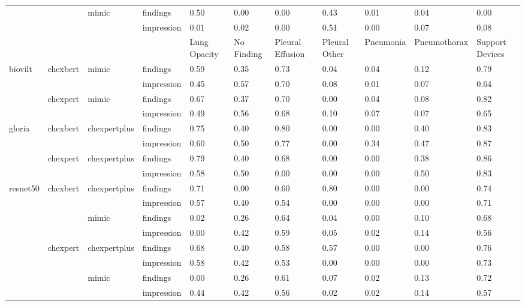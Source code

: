 \begin{tabular}{lllllllllll}
\cmidrule(lr){3-11}
 &  & \multirow[t]{2}{*}{mimic} & findings & 0.50 & 0.00 & 0.00 & 0.43 & 0.01 & 0.04 & 0.00 \\
 &  &  & impression & 0.01 & 0.02 & 0.00 & 0.51 & 0.00 & 0.07 & 0.08 \\
\cmidrule(lr){1-11} \cmidrule(lr){2-11} \cmidrule(lr){3-11}
 &  &  &  & Lung Opacity & No Finding & Pleural Effusion & Pleural Other & Pneumonia & Pneumothorax & Support Devices \\
\cmidrule(lr){1-11} \cmidrule(lr){2-11} \cmidrule(lr){3-11}
\multirow[t]{4}{*}{biovilt} & \multirow[t]{2}{*}{chexbert} & \multirow[t]{2}{*}{mimic} & findings & 0.59 & 0.35 & 0.73 & 0.04 & 0.04 & 0.12 & 0.79 \\
 &  &  & impression & 0.45 & 0.57 & 0.70 & 0.08 & 0.01 & 0.07 & 0.64 \\
\cmidrule(lr){2-11} \cmidrule(lr){3-11}
 & \multirow[t]{2}{*}{chexpert} & \multirow[t]{2}{*}{mimic} & findings & 0.67 & 0.37 & 0.70 & 0.00 & 0.04 & 0.08 & 0.82 \\
 &  &  & impression & 0.49 & 0.56 & 0.68 & 0.10 & 0.07 & 0.07 & 0.65 \\
\cmidrule(lr){1-11} \cmidrule(lr){2-11} \cmidrule(lr){3-11}
\multirow[t]{4}{*}{gloria} & \multirow[t]{2}{*}{chexbert} & \multirow[t]{2}{*}{chexpertplus} & findings & 0.75 & 0.40 & 0.80 & 0.00 & 0.00 & 0.40 & 0.83 \\
 &  &  & impression & 0.60 & 0.50 & 0.77 & 0.00 & 0.34 & 0.47 & 0.87 \\
\cmidrule(lr){2-11} \cmidrule(lr){3-11}
 & \multirow[t]{2}{*}{chexpert} & \multirow[t]{2}{*}{chexpertplus} & findings & 0.79 & 0.40 & 0.68 & 0.00 & 0.00 & 0.38 & 0.86 \\
 &  &  & impression & 0.58 & 0.50 & 0.00 & 0.00 & 0.00 & 0.50 & 0.83 \\
\cmidrule(lr){1-11} \cmidrule(lr){2-11} \cmidrule(lr){3-11}
\multirow[t]{8}{*}{resnet50} & \multirow[t]{4}{*}{chexbert} & \multirow[t]{2}{*}{chexpertplus} & findings & 0.71 & 0.00 & 0.60 & 0.80 & 0.00 & 0.00 & 0.74 \\
 &  &  & impression & 0.57 & 0.40 & 0.54 & 0.00 & 0.00 & 0.00 & 0.71 \\
\cmidrule(lr){3-11}
 &  & \multirow[t]{2}{*}{mimic} & findings & 0.02 & 0.26 & 0.64 & 0.04 & 0.00 & 0.10 & 0.68 \\
 &  &  & impression & 0.00 & 0.42 & 0.59 & 0.05 & 0.02 & 0.14 & 0.56 \\
\cmidrule(lr){2-11} \cmidrule(lr){3-11}
 & \multirow[t]{4}{*}{chexpert} & \multirow[t]{2}{*}{chexpertplus} & findings & 0.68 & 0.40 & 0.58 & 0.57 & 0.00 & 0.00 & 0.76 \\
 &  &  & impression & 0.58 & 0.42 & 0.53 & 0.00 & 0.00 & 0.00 & 0.73 \\
\cmidrule(lr){3-11}
 &  & \multirow[t]{2}{*}{mimic} & findings & 0.00 & 0.26 & 0.61 & 0.07 & 0.02 & 0.13 & 0.72 \\
 &  &  & impression & 0.44 & 0.42 & 0.56 & 0.02 & 0.02 & 0.14 & 0.57 \\
\cmidrule(lr){1-11} \cmidrule(lr){2-11} \cmidrule(lr){3-11}
\bottomrule
\end{tabular}
